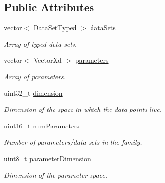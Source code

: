 \subsection*{Public Attributes}
\begin{DoxyCompactItemize}
\item 
\hypertarget{struct_d_r_d_s_p_1_1_data_system_typed_a99939d1840632745127aa328eb4845f8}{vector$<$ \hyperlink{struct_d_r_d_s_p_1_1_data_set_typed}{Data\-Set\-Typed} $>$ \hyperlink{struct_d_r_d_s_p_1_1_data_system_typed_a99939d1840632745127aa328eb4845f8}{data\-Sets}}\label{struct_d_r_d_s_p_1_1_data_system_typed_a99939d1840632745127aa328eb4845f8}

\begin{DoxyCompactList}\small\item\em Array of typed data sets. \end{DoxyCompactList}\item 
\hypertarget{struct_d_r_d_s_p_1_1_data_system_typed_a68a32ce5ca326ebe2eadab955cdaf020}{vector$<$ Vector\-Xd $>$ \hyperlink{struct_d_r_d_s_p_1_1_data_system_typed_a68a32ce5ca326ebe2eadab955cdaf020}{parameters}}\label{struct_d_r_d_s_p_1_1_data_system_typed_a68a32ce5ca326ebe2eadab955cdaf020}

\begin{DoxyCompactList}\small\item\em Array of parameters. \end{DoxyCompactList}\item 
\hypertarget{struct_d_r_d_s_p_1_1_data_system_typed_a2b4eaddeb36714703850fdb92050ca0a}{uint32\-\_\-t \hyperlink{struct_d_r_d_s_p_1_1_data_system_typed_a2b4eaddeb36714703850fdb92050ca0a}{dimension}}\label{struct_d_r_d_s_p_1_1_data_system_typed_a2b4eaddeb36714703850fdb92050ca0a}

\begin{DoxyCompactList}\small\item\em Dimension of the space in which the data points live. \end{DoxyCompactList}\item 
\hypertarget{struct_d_r_d_s_p_1_1_data_system_typed_a965e1066f9c4449413add3978a4cb0af}{uint16\-\_\-t \hyperlink{struct_d_r_d_s_p_1_1_data_system_typed_a965e1066f9c4449413add3978a4cb0af}{num\-Parameters}}\label{struct_d_r_d_s_p_1_1_data_system_typed_a965e1066f9c4449413add3978a4cb0af}

\begin{DoxyCompactList}\small\item\em Number of parameters/data sets in the family. \end{DoxyCompactList}\item 
\hypertarget{struct_d_r_d_s_p_1_1_data_system_typed_af3b60c8a97dc029652d551b7cdd34be4}{uint8\-\_\-t \hyperlink{struct_d_r_d_s_p_1_1_data_system_typed_af3b60c8a97dc029652d551b7cdd34be4}{parameter\-Dimension}}\label{struct_d_r_d_s_p_1_1_data_system_typed_af3b60c8a97dc029652d551b7cdd34be4}

\begin{DoxyCompactList}\small\item\em Dimension of the parameter space. \end{DoxyCompactList}\end{DoxyCompactItemize}


